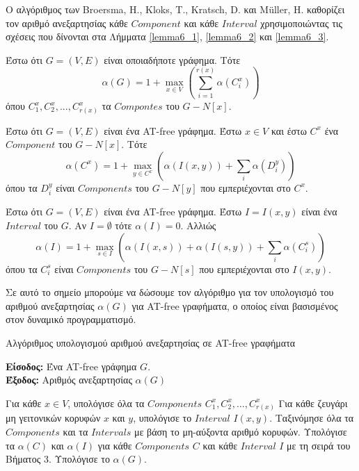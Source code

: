Ο αλγόριθμος των Broersma, H., Kloks, T., Kratsch, D. και Müller, H. καθορίζει τον αριθμό ανεξαρτησίας κάθε $Component$ και κάθε $Interval$ χρησιμοποιώντας τις σχέσεις που δίνονται στα Λήμματα \ref{lemma6_1}, \ref{lemma6_2} και \ref{lemma6_3}.

\begin{lemma}
	\label{lemma6_1}
	Έστω ότι $G = (V,E)$ είναι οποιαδήποτε γράφημα. 
	Τότε $$\alpha(G)=1+\max_{x\in V}\left(\sum_{i=1}^{r(x)}\alpha(C_i^x)\right)$$ όπου  $C_1^x, C_2^x,...,C_{r(x)}^x$ τα $Compontes$ του $G - N[x]$.
\end{lemma}

\begin{lemma}
	\label{lemma6_2}
	Έστω ότι $G = (V,E)$ είναι ένα AT-free γράφημα. Έστω $x \in V$ και έστω $C^x$ ένα $Component$ του $G - N[x]$. Τότε $$\alpha(C^x)=1+\max_{y\in C^x}\left(\alpha(I(x,y))+\sum_{i}\alpha(D_i^y)\right)$$ όπου τα $D_i^y$ είναι $Components$ του $G - N[y]$ που εμπεριέχονται στο $C^x$. 
\end{lemma}

\begin{lemma}
	\label{lemma6_3}
	Έστω ότι $G = (V,E)$ είναι ένα AT-free γράφημα. Έστω $I = I(x,y)$ είναι ένα $Interval$ του $G$. Αν $I = \emptyset$ τότε $\alpha(I) = 0$. Αλλιώς $$\alpha(I)=1+\max_{s\in I}\left(\alpha(I(x,s))+\alpha(I(s,y))+\sum_{i}\alpha(C_i^s)\right)$$ όπου τα $C_i^s$ είναι $Components$ του $G - N[s]$ που εμπεριέχονται στο $I(x,y)$.
\end{lemma}

Σε αυτό το σημείο μπορούμε να δώσουμε τον αλγόριθμο για τον υπολογισμό του αριθμού ανεξαρτησίας $\alpha(G)$ για AT-free γραφήματα, ο οποίος είναι βασισμένος στον δυναμικό προγραμματισμό. 

\begin{algorithm}[H]
	\caption{Αλγόριθμος υπολογισμού αριθμού ανεξαρτησίας σε AT-free γραφήματα}
	\label{alg:indep-set}
	
	\hspace*{\algorithmicindent} \textbf{Είσοδος:} Ένα AT-free γράφημα $G$.\\
	
	\hspace*{\algorithmicindent} \textbf{Έξοδος:} Αριθμός ανεξαρτησίας $\alpha(G)$
	
	\begin{algorithmic}[1]
		
		\STATE Για κάθε $x \in V$, υπολόγισε όλα τα $Components$ $C_1^x , C_2^x , \ldots , C_{r(x)}^x$
		\STATE Για κάθε ζευγάρι μη γειτονικών κορυφών $x$ και $y$, υπολόγισε το $Interval$ $I(x, y)$.
		\STATE Ταξινόμησε όλα τα $Components$ και τα $Intervals$ με βάση το μη-αύξοντα αριθμό κορυφών.
		\STATE Υπολόγισε τα $\alpha(C)$ και $\alpha(I)$ για κάθε $Components$ $C$ και κάθε $Interval$ $I$ με τη σειρά του Βήματος 3.
		\STATE Υπολόγισε το $\alpha(G)$.
		
	\end{algorithmic}
\end{algorithm}

